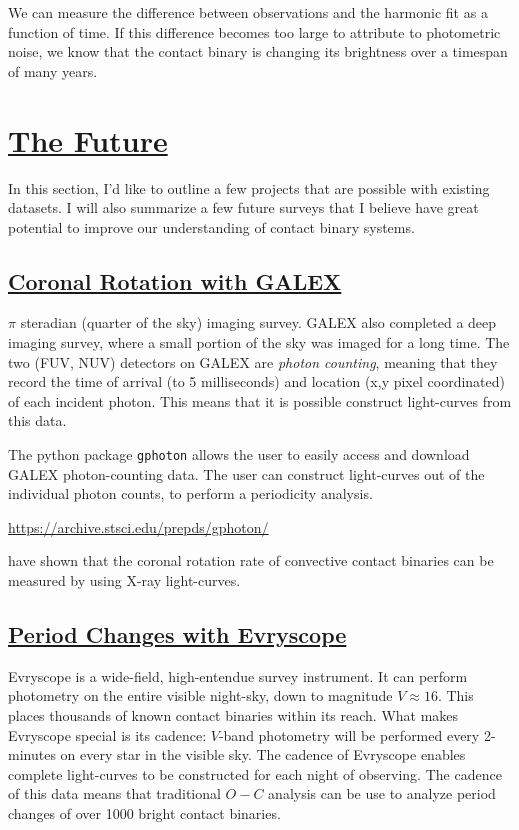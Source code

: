 \documentclass[12pt]{article} %
\numberwithin{equation}{section} %
\begin{document}
We can measure the difference between observations and the harmonic fit as a function of time. If this difference becomes too large to attribute to photometric noise, we know that the contact binary is changing its brightness over a timespan of many years.


\citep{bradstreet1988mapping}


\section[The Future]{\hyperlink{toc}{The Future}} \label{sec: The Future}

In this section, I'd like to outline a few projects that are possible with existing datasets. I will also summarize a few future surveys that I believe have great potential to improve our understanding of contact binary systems.

\subsection[Coronal Rotation with GALEX]{\hyperlink{toc}{Coronal Rotation with GALEX}}

$\pi$ steradian (quarter of the sky) imaging survey. GALEX also completed a deep imaging survey, where a small portion of the sky was imaged for a long time. The two (FUV, NUV) detectors on GALEX are \emph{photon counting}, meaning that they record the time of arrival (to 5 milliseconds) and location (x,y pixel coordinated) of each incident photon. This means that it is possible construct light-curves from this data.

The python package \texttt{gphoton} allows the user to easily access and download GALEX photon-counting data. The user can construct light-curves out of the individual photon counts, to perform a periodicity analysis.

\url{https://archive.stsci.edu/prepds/gphoton/}

\citet{mccale1996rosat} have shown that the coronal rotation rate of convective contact binaries can be measured by using X-ray light-curves.

\subsection[Period Changes with Evryscope]{\hyperlink{toc}{Period Changes with Evryscope}}

Evryscope is a wide-field, high-entendue survey instrument. It can perform photometry on the entire visible night-sky, down to magnitude $V \approx 16$. This places thousands of known contact binaries within its reach. What makes Evryscope special is its cadence: $V$-band photometry will be performed every 2-minutes on every star in the visible sky. The cadence of Evryscope enables complete light-curves to be constructed for each night of observing. The cadence of this data means that traditional $O - C$ analysis can be use to analyze period changes of over 1000 bright contact binaries.  
\end{document}
